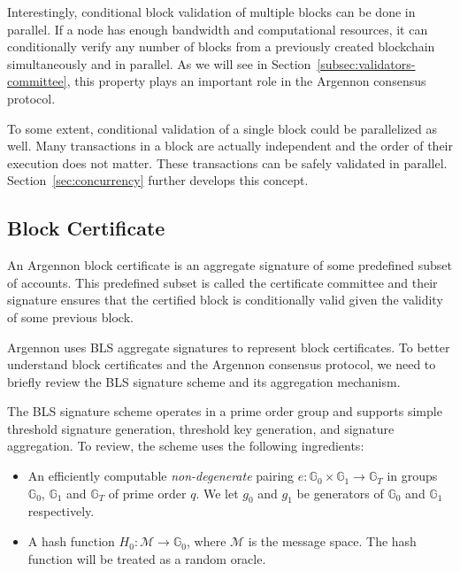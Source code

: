 Interestingly, conditional block validation of multiple blocks can be done in parallel. If a node has enough bandwidth
and computational resources, it can conditionally verify any number of blocks from a previously created blockchain
simultaneously and in parallel. As we will see in Section~\ref{subsec:validators-committee}, this property plays an
important role in the Argennon consensus protocol.

To some extent, conditional validation of a single block could be parallelized as well. Many transactions
in a block are actually independent and the order of their execution does not
matter. These transactions can be safely validated in parallel. Section~\ref{sec:concurrency} further
develops this concept.


\subsection{Block Certificate}\label{subsec:block-certificate}

An Argennon block certificate is an aggregate signature of some predefined subset of accounts. This predefined subset
is called the certificate committee and their signature ensures that the certified block is conditionally
valid given the validity of some previous block.

Argennon uses BLS aggregate signatures to represent block certificates. To better understand block certificates and
the Argennon consensus protocol, we need to briefly review the BLS signature scheme and its aggregation mechanism.

The BLS signature scheme operates in a prime order group and supports simple threshold signature generation,
threshold key generation, and signature aggregation. To review, the scheme uses the following ingredients:

\newcommand{\G}{\mathbb{G}}
\newcommand{\Z}{\mathbb{Z}}
\newcommand{\adv}{{\cal A}}
\newcommand{\bdv}{{\cal B}}
\newcommand{\deq}{\mathrel{\mathop:}=}
\newcommand{\SK}{\mathit{sk}}
\newcommand{\PK}{\mathit{pk}}
\newcommand{\C}{\mathit{cert}}
\newcommand{\APK}{\mathit{apk}}
\newcommand{\DPK}{\mathit{\Delta pk}}
\newcommand{\MM}{\mathcal{M}}
\newcommand{\xwedge}{\, \operatorname{\text{$\wedge$}}\, }
\newcommand{\abs}[1]{\lvert #1 \rvert}
\newcommand{\Hm}{H_0}
\newcommand{\Hpk}{H_1}
\newcommand{\qHpk}{Q_{\Hpk}}
\newcommand{\qHm}{Q_{\Hm}}
\newcommand{\qsig}{Q_{\text{sig}}}

\begin{itemize}
    \item An efficiently computable \emph{non-degenerate} pairing $e:\G_0 \times \G_1 \to \G_T$
    in groups $\G_0$, $\G_1$ and $\G_T$ of prime order $q$. We let $g_0$ and $g_1$ be generators
    of $\G_0$ and $\G_1$ respectively.
    \item A hash function $H_0: \mathcal{M} \rightarrow \mathbb{G}_0$, where $\mathcal{M}$ is the message space.
    The hash function will be treated as a random oracle.
\end{itemize}

